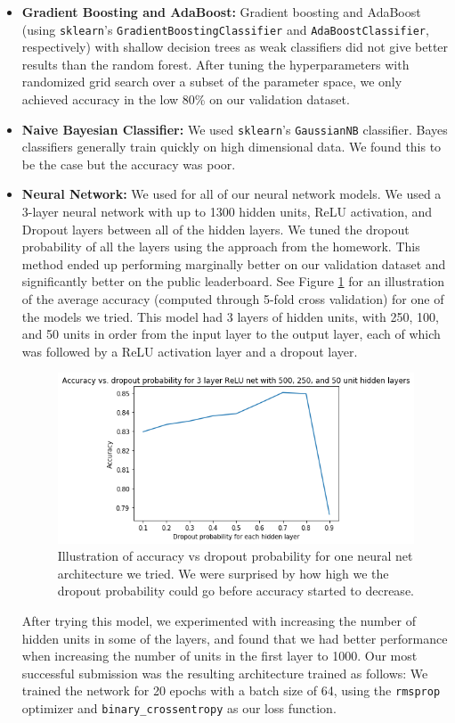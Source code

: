 \begin{itemize}
\begin{itemize}
  \item \textbf{Gradient Boosting and AdaBoost:} Gradient boosting and AdaBoost (using \texttt{sklearn}'s \texttt{GradientBoostingClassifier} and \texttt{AdaBoostClassifier}, respectively) with shallow decision trees as weak classifiers did not give better results than the random forest. After tuning the hyperparameters with randomized grid search over a subset of the parameter space, we only achieved accuracy in the low 80\% on our validation dataset. 
  \item \textbf{Naive Bayesian Classifier:} We used \texttt{sklearn}'s \texttt{GaussianNB} classifier. Bayes classifiers generally train quickly on high dimensional data. We found this to be the case but the accuracy was poor. 
  \item \textbf{Neural Network:} We used  for all of our neural network models. We used a 3-layer neural network with up to 1300 hidden units, ReLU activation, and Dropout layers between all of the hidden layers. We tuned the dropout probability of all the layers using the approach from the  homework. This method ended up performing marginally better on our validation dataset and significantly better on the public leaderboard. See Figure \ref{acc_vs_dropout_prob} for an illustration of the average accuracy (computed through 5-fold cross validation) for one of the models we tried. This model had 3 layers of hidden units, with 250, 100, and 50 units in order from the input layer to the output layer, each of which was followed by a ReLU activation layer and a dropout layer. 
    \begin{figure}[H]
      \centering
      \includegraphics[scale=0.5]{accuracy_vs_dropout_prob.png}
      \caption{Illustration of accuracy vs dropout probability for one neural net architecture we tried. We were surprised by how high we the dropout probability could go before accuracy started to decrease.}\label{acc_vs_dropout_prob}
    \end{figure}
    After trying this model, we experimented with increasing the number of hidden units in some of the layers, and found that we had better performance when increasing the number of units in the first layer to 1000. Our most successful submission was the resulting architecture trained as follows: We trained the network for 20 epochs with a batch size of 64, using the \texttt{rmsprop} optimizer and \texttt{binary\_crossentropy} as our loss function. 


\end{itemize}
\end{itemize}

